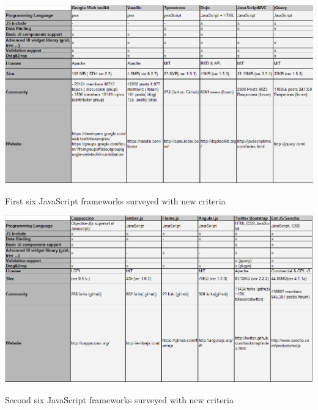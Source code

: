 \documentclass[14pt,a4paper]{extreport}
\begin{document}
			\begin{table}[ht]
				\begin{center}
					\includegraphics[scale=0.6]{JavaFrameTable1NewCriteria.png}
				
					\caption{First six JavaScript frameworks surveyed with new criteria}
				\end{center}
			
			\end{table}
			\begin{table}[ht]
				\begin{center}
					\includegraphics[scale=0.6]{JavaFrameTable2NewCriteria.png}
				
					\caption{Second six JavaScript frameworks surveyed with new criteria}
				\end{center}
			
			\end{table}
\end{document}

